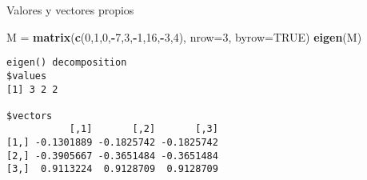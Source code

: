 \documentclass[
  ignorenonframetext,
]{beamer}
\newenvironment{Shaded}{\begin{snugshade}}{\end{snugshade}}
\newcommand{\DataTypeTok}[1]{\textcolor[rgb]{0.13,0.29,0.53}{#1}}
\newcommand{\DecValTok}[1]{\textcolor[rgb]{0.00,0.00,0.81}{#1}}
\newcommand{\KeywordTok}[1]{\textcolor[rgb]{0.13,0.29,0.53}{\textbf{#1}}}
\newcommand{\NormalTok}[1]{#1}
\newcommand{\OperatorTok}[1]{\textcolor[rgb]{0.81,0.36,0.00}{\textbf{#1}}}
\newcommand{\OtherTok}[1]{\textcolor[rgb]{0.56,0.35,0.01}{#1}}
\newcommand{\StringTok}[1]{\textcolor[rgb]{0.31,0.60,0.02}{#1}}
\begin{document}
\begin{frame}[fragile]{Valores y vectores propios}
\protect\hypertarget{valores-y-vectores-propios-4}{}

\begin{Shaded}
\begin{Highlighting}[]
\NormalTok{M =}\StringTok{ }\KeywordTok{matrix}\NormalTok{(}\KeywordTok{c}\NormalTok{(}\DecValTok{0}\NormalTok{,}\DecValTok{1}\NormalTok{,}\DecValTok{0}\NormalTok{,}\OperatorTok{-}\DecValTok{7}\NormalTok{,}\DecValTok{3}\NormalTok{,}\OperatorTok{-}\DecValTok{1}\NormalTok{,}\DecValTok{16}\NormalTok{,}\OperatorTok{-}\DecValTok{3}\NormalTok{,}\DecValTok{4}\NormalTok{), }\DataTypeTok{nrow=}\DecValTok{3}\NormalTok{, }\DataTypeTok{byrow=}\OtherTok{TRUE}\NormalTok{)}
\KeywordTok{eigen}\NormalTok{(M)}
\end{Highlighting}
\end{Shaded}

\begin{verbatim}
eigen() decomposition
$values
[1] 3 2 2

$vectors
           [,1]       [,2]       [,3]
[1,] -0.1301889 -0.1825742 -0.1825742
[2,] -0.3905667 -0.3651484 -0.3651484
[3,]  0.9113224  0.9128709  0.9128709
\end{verbatim}

\end{frame}
\end{document}
